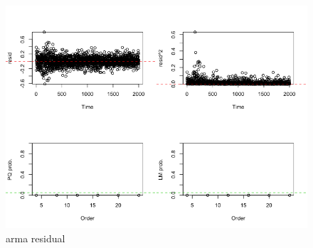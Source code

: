 \documentclass[a4paper, 11pt]{article}
\begin{document}
\begin{figure}[H]
\centering
\caption{arma residual}
\includegraphics[scale=.50]{hetero.png}
\end{figure}
\end{document}
